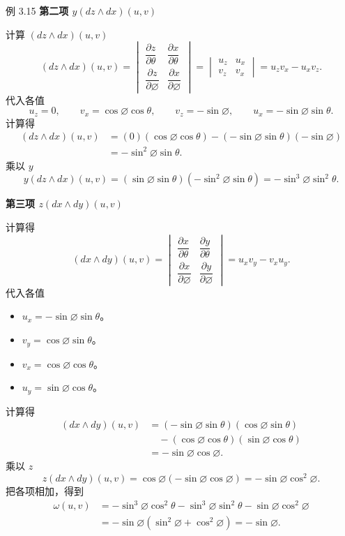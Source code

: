 \begin{statement}{例 3.15}{}
\noindent\textbf{第二项 $y(dz\wedge dx)(u,v)$}\par
计算 $(dz\wedge dx)(u,v)$
\[
  (dz\wedge dx)(u,v)
  =\begin{vmatrix}
    \dfrac{\partial z}{\partial\theta}&\dfrac{\partial x}{\partial\theta}\\[5pt]
    \dfrac{\partial z}{\partial\varnothing}&\dfrac{\partial x}{\partial\varnothing}
   \end{vmatrix}
  =\begin{vmatrix}u_z&u_x\\v_z&v_x\end{vmatrix}
  =u_zv_x-u_xv_z.
\]
代入各值
\[
  u_z=0,\qquad v_x=\cos\varnothing\cos\theta,\qquad
  v_z=-\sin\varnothing,\qquad u_x=-\sin\varnothing\sin\theta.
\]
计算得
\begin{align*}
  (dz\wedge dx)(u,v)&=(0)(\cos\varnothing\cos\theta)
    -(-\sin\varnothing\sin\theta)(-\sin\varnothing)\\
    &=-\sin^2\varnothing\sin\theta.
\end{align*}
乘以 $y$
\[
  y(dz\wedge dx)(u,v)=(\sin\varnothing\sin\theta)(-\sin^2\varnothing\sin\theta)
    =-\sin^3\varnothing\sin^2\theta.
\]

\noindent\textbf{第三项 $z(dx\wedge dy)(u,v)$}\par
计算得
\[
  (dx\wedge dy)(u,v)
  =\begin{vmatrix}
    \dfrac{\partial x}{\partial\theta}&\dfrac{\partial y}{\partial\theta}\\[5pt]
    \dfrac{\partial x}{\partial\varnothing}&\dfrac{\partial y}{\partial\varnothing}
   \end{vmatrix}
  =u_xv_y-v_xu_y.
\]
代入各值
\begin{itemize}
\item $u_x=-\sin\varnothing\sin\theta$。
\item $v_y=\cos\varnothing\sin\theta$。
\item $v_x=\cos\varnothing\cos\theta$。
\item $u_y=\sin\varnothing\cos\theta$。
\end{itemize}
计算得
\begin{align*}
  (dx\wedge dy)(u,v)&=(-\sin\varnothing\sin\theta)(\cos\varnothing\sin\theta)\\
    &\quad-(\cos\varnothing\cos\theta)(\sin\varnothing\cos\theta)\\
    &=-\sin\varnothing\cos\varnothing.
\end{align*}
乘以 $z$
\[
  z(dx\wedge dy)(u,v)=\cos\varnothing(-\sin\varnothing\cos\varnothing)
  =-\sin\varnothing\cos^2\varnothing.
\]
把各项相加，得到
\begin{align*}
  \omega(u,v)&=-\sin^3\varnothing\cos^2\theta
    -\sin^3\varnothing\sin^2\theta-\sin\varnothing\cos^2\varnothing\\
    &=-\sin\varnothing(\sin^2\varnothing+\cos^2\varnothing)=-\sin\varnothing.
\end{align*}


\end{statement}
